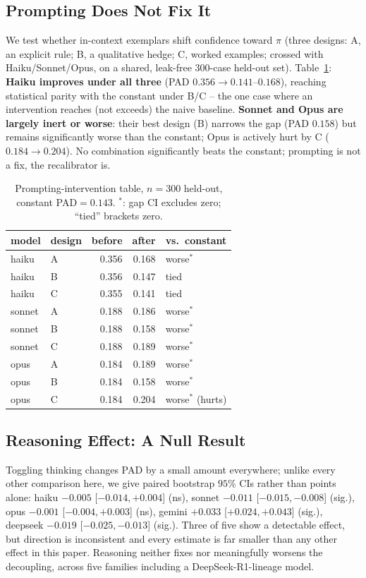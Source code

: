 \documentclass[letterpaper]{article} %
\begin{document}
\subsection{Prompting Does Not Fix It}
\label{sec:intervention}
We test whether in-context exemplars shift confidence toward $\pi$ (three
designs: A, an explicit rule; B, a qualitative hedge; C, worked examples;
crossed with Haiku/Sonnet/Opus, on a shared, leak-free $300$-case held-out
set). Table~\ref{tab:intervention}: \textbf{Haiku improves under all three}
(PAD $0.356\to0.141$--$0.168$), reaching statistical parity with the
constant under B/C -- the one case where an intervention reaches (not
exceeds) the naive baseline. \textbf{Sonnet and Opus are largely inert or
worse}: their best design (B) narrows the gap (PAD $0.158$) but remains
significantly worse than the constant; Opus is actively hurt by C ($0.184\to
0.204$). No combination significantly beats the constant; prompting is not a
fix, the recalibrator is.

\begin{table}[t]
\centering
\small
\begin{tabular}{llrrl}
\toprule
model & design & before & after & vs.\ constant \\
\midrule
haiku  & A & 0.356 & 0.168 & worse$^\ast$ \\
haiku  & B & 0.356 & 0.147 & tied \\
haiku  & C & 0.355 & 0.141 & tied \\
sonnet & A & 0.188 & 0.186 & worse$^\ast$ \\
sonnet & B & 0.188 & 0.158 & worse$^\ast$ \\
sonnet & C & 0.188 & 0.189 & worse$^\ast$ \\
opus   & A & 0.184 & 0.189 & worse$^\ast$ \\
opus   & B & 0.184 & 0.158 & worse$^\ast$ \\
opus   & C & 0.184 & 0.204 & worse$^\ast$ (hurts) \\
\bottomrule
\end{tabular}
\caption{Prompting-intervention table, $n{=}300$ held-out, constant PAD$=0.143$. $^\ast$: gap CI excludes zero; ``tied'' brackets zero.}
\label{tab:intervention}
\end{table}

\subsection{Reasoning Effect: A Null Result}
Toggling thinking changes PAD by a small amount everywhere; unlike every
other comparison here, we give paired bootstrap $95\%$ CIs rather than
points alone: haiku $-0.005$ [$-0.014,+0.004$] (ns), sonnet $-0.011$
[$-0.015,-0.008$] (sig.), opus $-0.001$ [$-0.004,+0.003$] (ns), gemini
$+0.033$ [$+0.024,+0.043$] (sig.), deepseek $-0.019$ [$-0.025,-0.013$]
(sig.). Three of five show a detectable effect, but direction is
inconsistent and every estimate is far smaller than any other effect in this
paper. Reasoning neither fixes nor meaningfully worsens the decoupling,
across five families including a DeepSeek-R1-lineage model.
\end{document}
